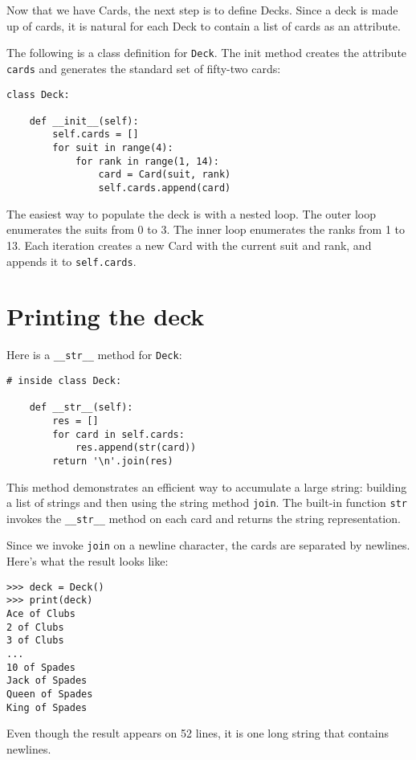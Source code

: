 \documentclass[10pt]{book}
\begin{document}
Now that we have Cards, the next step is to define Decks.  Since a
deck is made up of cards, it is natural for each Deck to contain a
list of cards as an attribute.

The following is a class definition for {\tt Deck}.  The
init method creates the attribute {\tt cards} and generates
the standard set of fifty-two cards:

\begin{verbatim}
class Deck:

    def __init__(self):
        self.cards = []
        for suit in range(4):
            for rank in range(1, 14):
                card = Card(suit, rank)
                self.cards.append(card)
\end{verbatim}
%
The easiest way to populate the deck is with a nested loop.  The outer
loop enumerates the suits from 0 to 3.  The inner loop enumerates the
ranks from 1 to 13.  Each iteration
creates a new Card with the current suit and rank,
and appends it to {\tt self.cards}.


\section{Printing the deck}
\label{printdeck}

Here is a \verb"__str__" method for {\tt Deck}:

\begin{verbatim}
# inside class Deck:

    def __str__(self):
        res = []
        for card in self.cards:
            res.append(str(card))
        return '\n'.join(res)
\end{verbatim}
%
This method demonstrates an efficient way to accumulate a large
string: building a list of strings and then using the string method
{\tt join}.  The built-in function {\tt str} invokes the
\verb"__str__" method on each card and returns the string
representation.   
  

Since we invoke {\tt join} on a newline character, the cards
are separated by newlines.  Here's what the result looks like:

\begin{verbatim}
>>> deck = Deck()
>>> print(deck)
Ace of Clubs
2 of Clubs
3 of Clubs
...
10 of Spades
Jack of Spades
Queen of Spades
King of Spades
\end{verbatim}
%
Even though the result appears on 52 lines, it is
one long string that contains newlines.
\end{document}
